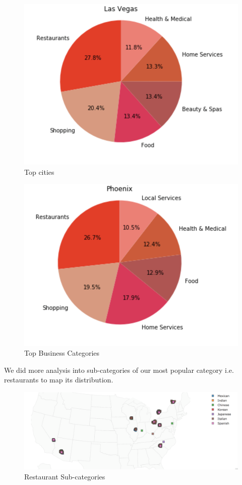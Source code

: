 \documentclass[11pt]{article}
\begin{document}
     	\begin{figure}[h]
     		\centering
     		\includegraphics[scale=0.7] {top_cities.png}
     		\caption{Top cities}
     	\end{figure}
	     \begin{figure}[h]
	     	\centering
	     	\includegraphics[scale=0.7] {top_categroies.png}
	     	\caption{Top Business Categories}
	     \end{figure}
     We did more analysis into sub-categories of our most popular category i.e. restaurants to map its distribution.
      \begin{figure}[h]
     	\centering
     	\includegraphics[scale=0.5] {category_map.png}
     	\caption{Restaurant Sub-categories}
     \end{figure}
      
\end{document}

